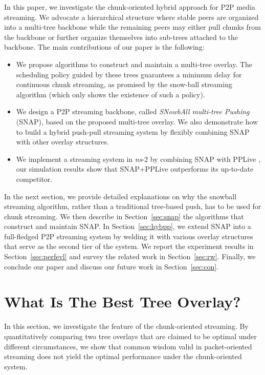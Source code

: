\documentclass[conference]{IEEEtran}
\begin{document}
  In this paper, we investigate the chunk-oriented hybrid approach for P2P media streaming. We advocate a hierarchical structure where stable peers \cite{WangLX-INFOCOM08,LiuWLZ-INFOCOM09} are organized into a multi-tree backbone while the remaining peers may either pull chunks from the backbone or further organize themselves into sub-trees attached to the backbone. The main contributions of our paper is the following:
\begin{itemize}
  \item We propose algorithms to construct and maintain a multi-tree overlay. The scheduling policy guided by these trees guarantees a minimum delay for continuous chunk streaming, as promised by the snow-ball streaming algorithm (which only shows the existence of such a policy).
\item We design a P2P streaming backbone, called \textit{SNowbAll multi-tree Pushing} (SNAP), based on the proposed multi-tree overlay. We also demonstrate how to build a hybrid push-pull streaming system by flexibly combining SNAP with other overlay structures.
\item We implement a streaming system in \textit{ns}-2 by combining SNAP with PPLive \cite{HeiLLLR-IPTV06}, our simulation results show that SNAP+PPLive outperforms its up-to-date competitor.
  \end{itemize}

   In the next section, we provide detailed explanations on why the snowball streaming algorithm, rather than a traditional tree-based push, has to be used for chunk streaming. We then describe in Section~\ref{sec:snap} the algorithms that construct and maintain SNAP. In Section~\ref{sec:hybpp}, we extend SNAP into a full-fledged P2P streaming system by  welding it with various overlay structures that serve as the second tier of the system. We report the experiment results in Section~\ref{sec:perfevl} and survey the related work in Section~\ref{sec:rw}. Finally, we conclude our paper and discuss our future work in Section~\ref{sec:con}.

\section{What Is The Best Tree Overlay?} \label{sec:best}
In this section, we investigate the feature of the chunk-oriented streaming. By quantitatively comparing two tree overlays that are claimed to be optimal under different circumstances, we show that common wisdom valid in packet-oriented streaming does not yield the optimal performance under the chunk-oriented system.
\end{document}
